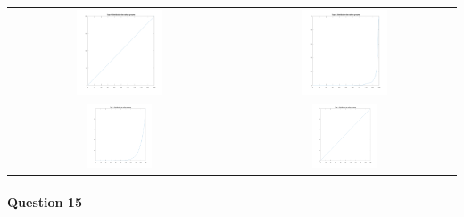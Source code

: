 \documentclass{article}
\begin{document}
\begin{table}[H]
	\centering
	\begin{tabular}{cc}
		\includegraphics[width=0.4\textwidth]{distribution_type_1.png}
		& \includegraphics[width=0.4\textwidth]{distribution_type_2.png} \\
		\includegraphics[width=0.3\textwidth]{distribution_type_3.png}
		& \includegraphics[width=0.3\textwidth]{distribution_type_4.png} \\
	\end{tabular}
\end{table}

\paragraph{Question 15}
\end{document}
